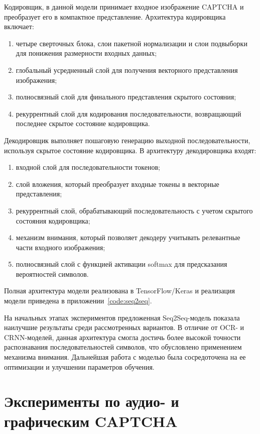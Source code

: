 Кодировщик, в данной модели принимает входное изображение CAPTCHA и преобразует 
его в компактное представление. Архитектура кодировщика включает:

\begin{enumerate}
    \item четыре сверточных блока, слои пакетной нормализации и слои подвыборки 
    для понижения размерности входных данных;
    \item глобальный усредненный слой для получения векторного представления 
    изображения;
    \item полносвязный слой для финального представления скрытого состояния;
    \item рекуррентный слой для кодирования последовательности, возвращающий 
    последнее скрытое состояние кодировщика.
\end{enumerate}

Декодировщик выполняет пошаговую генерацию выходной последовательности, используя 
скрытое состояние кодировщика. В архитектуру декодировщика входят:

\begin{enumerate}
    \item входной слой для последовательности токенов;
    \item слой вложения, который преобразует входные токены в векторные 
    представления;
    \item рекуррентный слой, обрабатывающий последовательность с учетом скрытого 
    состояния кодировщика;
    \item механизм внимания, который позволяет декодеру учитывать релевантные 
    части входного изображения;
    \item полносвязный слой с функцией активации softmax для предсказания 
    вероятностей символов.
\end{enumerate}

Полная архитектура модели реализована в TensorFlow/Keras и реализация модели 
приведена в приложении~\ref{code:seq2seq}.

На начальных этапах экспериментов предложенная Seq2Seq-модель показала наилучшие 
результаты среди рассмотренных вариантов. В отличие от OCR- и CRNN-моделей, 
данная архитектура смогла достичь более высокой точности распознавания 
последовательностей символов, что обусловлено применением механизма внимания. 
Дальнейшая работа с моделью была сосредоточена на ее оптимизации и улучшении 
параметров обучения.

\section{Эксперименты по аудио- и графическим CAPTCHA}

